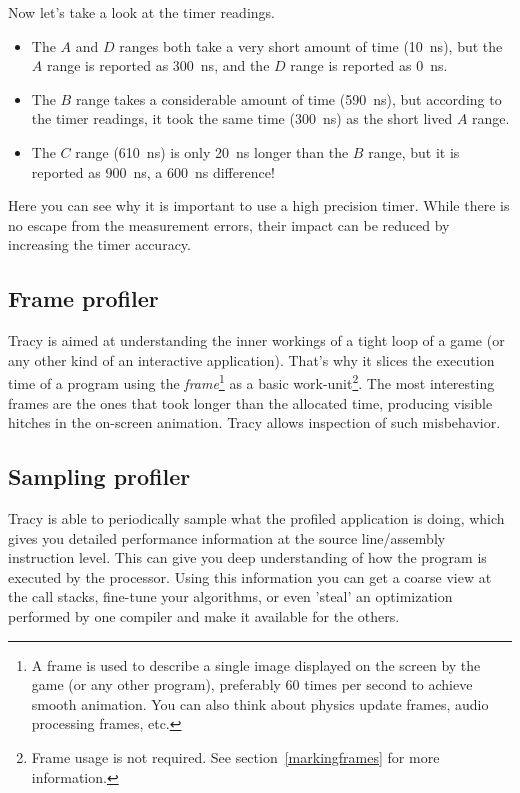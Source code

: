 \documentclass[hidelinks,titlepage,a4paper]{article}
\begin{document}
Now let's take a look at the timer readings.

\begin{itemize}
\item The $A$ and $D$ ranges both take a very short amount of time (10~\si{\nano\second}), but the $A$ range is reported as 300~\si{\nano\second}, and the $D$ range is reported as 0~\si{\nano\second}.
\item The $B$ range takes a considerable amount of time (590~\si{\nano\second}), but according to the timer readings, it took the same time (300~\si{\nano\second}) as the short lived $A$ range.
\item The $C$ range (610~\si{\nano\second}) is only 20~\si{\nano\second} longer than the $B$ range, but it is reported as 900~\si{\nano\second}, a 600~\si{\nano\second} difference!
\end{itemize}

Here you can see why it is important to use a high precision timer. While there is no escape from the measurement errors, their impact can be reduced by increasing the timer accuracy.

\subsection{Frame profiler}

Tracy is aimed at understanding the inner workings of a tight loop of a game (or any other kind of an interactive application). That's why it slices the execution time of a program using the \emph{frame}\footnote{A frame is used to describe a single image displayed on the screen by the game (or any other program), preferably 60 times per second to achieve smooth animation. You can also think about physics update frames, audio processing frames, etc.} as a basic work-unit\footnote{Frame usage is not required. See section~\ref{markingframes} for more information.}. The most interesting frames are the ones that took longer than the allocated time, producing visible hitches in the on-screen animation. Tracy allows inspection of such misbehavior.

\subsection{Sampling profiler}

Tracy is able to periodically sample what the profiled application is doing, which gives you detailed performance information at the source line/assembly instruction level. This can give you deep understanding of how the program is executed by the processor. Using this information you can get a coarse view at the call stacks, fine-tune your algorithms, or even 'steal' an optimization performed by one compiler and make it available for the others.
\end{document}
